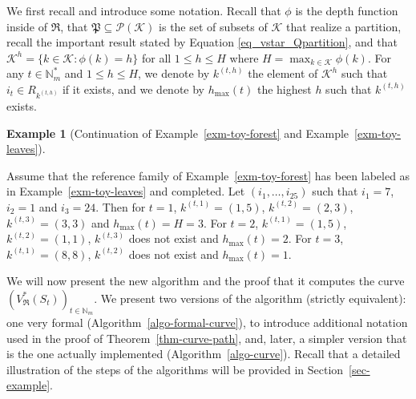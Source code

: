 \documentclass[
  11pt,
  a4paper,
]{article}
\theoremstyle{plain}
\theoremstyle{plain}
\theoremstyle{definition}
\newtheorem{example}{Example}[section]
\theoremstyle{plain}
\theoremstyle{definition}
\theoremstyle{remark}
\begin{document}
We first recall and introduce some notation. Recall that \(\phi\) is the
depth function inside of \(\mathfrak{R}\), that
\(\mathfrak P \subseteq \mathcal P(\mathcal{K})\) is the set of subsets
of \(\mathcal{K}\) that realize a partition, recall the important result
stated by Equation \eqref{eq_vstar_Qpartition}, and that
\(\mathcal{K}^h=\{ k\in\mathcal{K}: \phi(k)=h  \}\) for all
\(1\leq h\leq H\) where \(H=\max_{k\in\mathcal{K}}\phi(k)\). For any
\(t\in\mathbb{N}_m^*\) and \(1\leq h\leq H\), we denote by \(k^{(t,h)}\)
the element of \(\mathcal{K}^h\) such that \(i_t\in R_{k^{(t,h)}}\) if
it exists, and we denote by \(h_{\max}(t)\) the highest \(h\) such that
\(k^{(t,h)}\) exists.

\begin{example}[Continuation of Example~\ref{exm-toy-forest} and
Example~\ref{exm-toy-leaves}]\protect\hypertarget{exm-kth}{}\label{exm-kth}

Assume that the reference family of Example~\ref{exm-toy-forest} has
been labeled as in Example~\ref{exm-toy-leaves} and completed. Let
\((i_1,\dotsc, i_{25})\) such that \(i_1=7\), \(i_2=1\) and \(i_3=24\).
Then for \(t=1\), \(k^{(t,1)}=(1,5)\), \(k^{(t,2)}=(2,3)\),
\(k^{(t,3)}=(3,3)\) and \(h_{\max}(t)=H=3\). For \(t=2\),
\(k^{(t,1)}=(1,5)\), \(k^{(t,2)}=(1,1)\), \(k^{(t,3)}\) does not exist
and \(h_{\max}(t)=2\). For \(t=3\), \(k^{(t,1)}=(8,8)\), \(k^{(t,2)}\)
does not exist and \(h_{\max}(t)=1\).

\end{example}

We will now present the new algorithm and the proof that it computes the
curve \((V^*_{\mathfrak{R}}(S_t))_{t\in\mathbb{N}_m}\). We present two
versions of the algorithm (strictly equivalent): one very formal
(Algorithm~\ref{algo-formal-curve}), to introduce additional notation
used in the proof of Theorem~\ref{thm-curve-path}, and, later, a simpler
version that is the one actually implemented
(Algorithm~\ref{algo-curve}). Recall that a detailed illustration of the
steps of the algorithms will be provided in Section~\ref{sec-example}.
\end{document}
